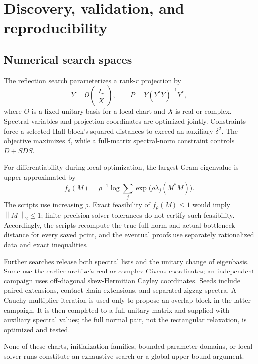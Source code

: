 \documentclass[11pt,letterpaper]{article}
\theoremstyle{remark}\newtheorem{remark}[theorem]{Remark}
\newcommand{\norm}[1]{\left\lVert#1\right\rVert_2}\newcommand{\abs}[1]{\left|#1\right|}\newcommand{\diag}{\operatorname{diag}}\newcommand{\rank}{\operatorname{rank}}
\begin{document}
\section{Discovery, validation, and reproducibility}\label{sec:computation}
\subsection{Numerical search spaces}
The reflection search parameterizes a rank-$r$ projection by
\[
Y=O\begin{pmatrix}I_r\\X\end{pmatrix},\qquad P=Y(Y^*Y)^{-1}Y^*,
\]
where $O$ is a fixed unitary basis for a local chart and $X$ is real or complex. Spectral variables and projection coordinates are optimized jointly. Constraints force a selected Hall block's squared distances to exceed an auxiliary $\delta^2$. The objective maximizes $\delta$, while a full-matrix spectral-norm constraint controls $D+SDS$.

For differentiability during local optimization, the largest Gram eigenvalue is upper-approximated by
\[
f_\rho(M)=\rho^{-1}\log\sum_j\exp\bigl(\rho\lambda_j(M^*M)\bigr).
\]
The scripts use increasing $\rho$. Exact feasibility of $f_\rho(M)\le1$ would imply $\norm M\le1$; finite-precision solver tolerances do not certify such feasibility. Accordingly, the scripts recompute the true full norm and actual bottleneck distance for every saved point, and the eventual proofs use separately rationalized data and exact inequalities.

Further searches release both spectral lists and the unitary change of eigenbasis. Some use the earlier archive's real or complex Givens coordinates; an independent campaign uses off-diagonal skew-Hermitian Cayley coordinates. Seeds include paired extensions, contact-chain extensions, and separated zigzag spectra. A Cauchy-multiplier iteration is used only to propose an overlap block in the latter campaign. It is then completed to a full unitary matrix and supplied with auxiliary spectral values; the full normal pair, not the rectangular relaxation, is optimized and tested.

None of these charts, initialization families, bounded parameter domains, or local solver runs constitute an exhaustive search or a global upper-bound argument.
\end{document}
